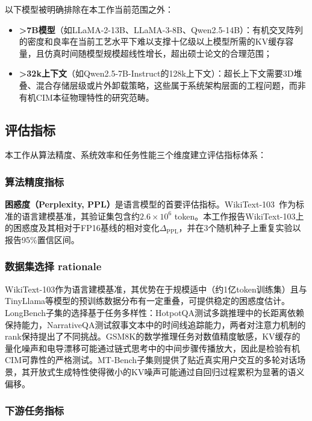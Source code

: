 以下模型被明确排除在本工作当前范围之外：

\begin{itemize}
    \item \textbf{>7B模型}（如LLaMA-2-13B、LLaMA-3-8B、Qwen2.5-14B）：有机交叉阵列的密度和良率在当前工艺水平下难以支撑十亿级以上模型所需的KV缓存容量，且仿真时间随模型规模超线性增长，超出硕士论文的合理范围；
    \item \textbf{>32k上下文}（如Qwen2.5-7B-Instruct的128k上下文）：超长上下文需要3D堆叠、混合存储层级或片外卸载策略，这些属于系统架构层面的工程问题，而非有机CIM本征物理特性的研究范畴。
\end{itemize}

\subsection{评估指标}

本工作从算法精度、系统效率和任务性能三个维度建立评估指标体系：

\subsubsection{算法精度指标}

\textbf{困惑度（Perplexity, PPL）}是语言模型的首要评估指标。WikiText-103~\cite{merity2016pointer}作为标准的语言建模基准，其验证集包含约$2.6 \times 10^6$ token。本工作报告WikiText-103上的困惑度及其相对于FP16基线的相对变化$\Delta_{\text{PPL}}$，并在3个随机种子上重复实验以报告95\%置信区间。

\subsubsection{数据集选择 rationale}

WikiText-103作为语言建模基准，其优势在于规模适中（约1亿token训练集）且与TinyLlama等模型的预训练数据分布有一定重叠，可提供稳定的困惑度估计。LongBench子集的选择基于任务多样性：HotpotQA测试多跳推理中的长距离依赖保持能力，NarrativeQA测试叙事文本中的时间线追踪能力，两者对注意力机制的rank保持提出了不同挑战。GSM8K的数学推理任务对数值精度敏感，KV缓存的量化噪声和电导漂移可能通过链式思考中的中间步骤传播放大，因此是检验有机CIM可靠性的严格测试。MT-Bench子集则提供了贴近真实用户交互的多轮对话场景，其开放式生成特性使得微小的KV噪声可能通过自回归过程累积为显著的语义偏移。

\subsubsection{下游任务指标}

